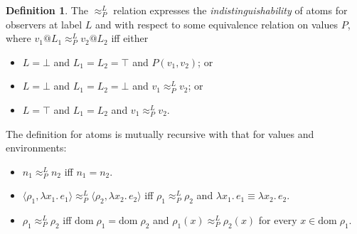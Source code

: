 \documentclass{article}
\makeatletter
\newcommand{\at}{\ensuremath{{\scriptstyle{@}}}}
\theoremstyle{definition}
\newtheorem{definition}{Definition}
\makeatother
\begin{document}
\begin{definition}
  The $\approx^{L}_{P}$ relation expresses the \emph{indistinguishability} of
  atoms for observers at label $L$ and with respect to some equivalence
  relation on values $P$, where
  $v_1 \at L_1 \approx^{L}_{P} v_2 \at L_2$ iff either
  \begin{itemize}
  \item $L = \bot$ and
    $L_1 = L_2 = \top$ and $P(v_1, v_2)$; or
  \item $L = \bot$ and
    $L_1 = L_2 = \bot$ and $v_1 \approx^{L}_{P} v_2$; or
  \item $L = \top$ and $L_1 = L_2$ and $v_1 \approx^{L}_{P} v_2$.
  \end{itemize}
  The definition for atoms is mutually recursive with that for values and
  environments:
  \begin{itemize}
  \item $n_1 \approx^{L}_{P} n_2$ iff $n_1 = n_2$.
  \item
    $\langle{\rho_1, \lambda{x_1}.\, e_1\rangle} \approx^{L}_{P}
    \langle{\rho_2, \lambda{x_2}.\, e_2\rangle}$ iff
    $\rho_1 \approx^{L}_{P} \rho_2$ and
    $\lambda{x_1}.\, e_1 \equiv \lambda{x_2}.\, e_2$.
  \item $\rho_1 \approx^{L}_{P} \rho_2$ iff
    $\mathrm{dom}\; \rho_1 = \mathrm{dom}\; \rho_2$ and
    $\rho_1(x) \approx^{L}_{P} \rho_2(x)$ for every
    $x \in \mathrm{dom}\; \rho_1$.
  \end{itemize}
  \label{def:indistinguishability}
\end{definition}
\end{document}
